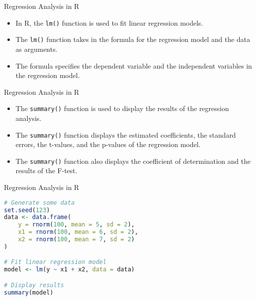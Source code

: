 \documentclass[serif, 9pt, aspectratio=32]{beamer}
\begin{document}
\begin{frame}{Regression Analysis in R}
    \begin{itemize}
        \setlength{\itemsep}{2em}
        \item In R, the \texttt{lm()} function is used to fit linear regression models.
        \item The \texttt{lm()} function takes in the formula for the regression model and the data as arguments.
        \item The formula specifies the dependent variable and the independent variables in the regression model.
    \end{itemize}
\end{frame}

\begin{frame}{Regression Analysis in R}
    \begin{itemize}
        \setlength{\itemsep}{2em}
        \item The \texttt{summary()} function is used to display the results of the regression analysis.
        \item The \texttt{summary()} function displays the estimated coefficients, the standard errors, the t-values, and the p-values of the regression model.
        \item The \texttt{summary()} function also displays the coefficient of determination and the results of the F-test.
    \end{itemize}
\end{frame}

\begin{frame}[fragile]{Regression Analysis in R}
    \begin{lstlisting}[language=R]
# Generate some data
set.seed(123)
data <- data.frame(
    y = rnorm(100, mean = 5, sd = 2),
    x1 = rnorm(100, mean = 6, sd = 2),
    x2 = rnorm(100, mean = 7, sd = 2)
)

# Fit linear regression model
model <- lm(y ~ x1 + x2, data = data)

# Display results
summary(model)
    \end{lstlisting}
\end{frame}


\end{document}
